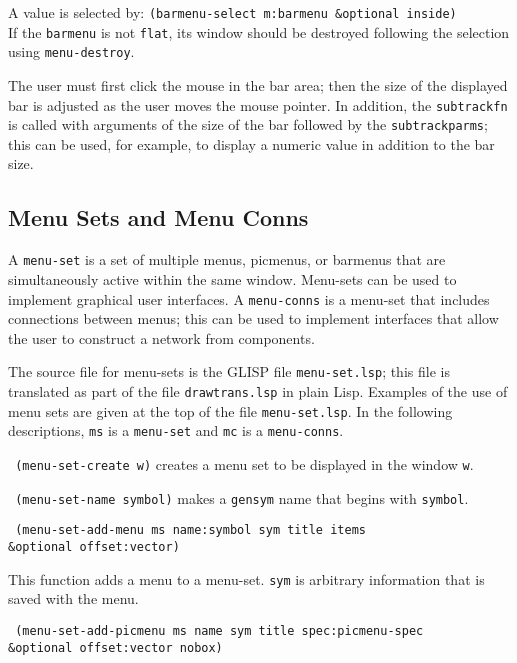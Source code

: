 A value is selected by: {\tt (barmenu-select m:barmenu \&optional inside)} \\
If the {\tt barmenu} is not {\tt flat}, its window should be destroyed
following the selection using {\tt menu-destroy}.

The user must first click the mouse in the bar area; then
the size of the displayed bar is adjusted as the user moves the mouse
pointer.  In addition, the {\tt subtrackfn} is called with arguments
of the size of the bar followed by the {\tt subtrackparms}; this can
be used, for example, to display a numeric value in addition to the
bar size.


\subsection{Menu Sets and Menu Conns}

A {\tt menu-set} is a set of multiple menus, picmenus, or barmenus
that are simultaneously active within the same window.  Menu-sets
can be used to implement graphical user interfaces.  A {\tt menu-conns}
is a menu-set that includes connections between menus; this can be
used to implement interfaces that allow the user to construct a network
from components.

The source file for menu-sets is the GLISP file {\tt menu-set.lsp};
this file is translated as part of the file {\tt drawtrans.lsp} in
plain Lisp.  Examples of the use of menu sets are given at the top
of the file {\tt menu-set.lsp}.  In the following descriptions,
{\tt ms} is a {\tt menu-set} and {\tt mc} is a {\tt menu-conns}.

{\tt \hspace*{0.5in} (menu-set-create w)} creates a menu set to be displayed
in the window {\tt w}.

{\tt \hspace*{0.5in} (menu-set-name symbol)} makes a {\tt gensym} name that
begins with {\tt symbol}.

{\tt \hspace*{0.5in} (menu-set-add-menu ms name:symbol sym title items} \\
\hspace*{1.5in} {\tt \&optional offset:vector)}

This function adds a menu to a menu-set.  {\tt sym} is arbitrary
information that is saved with the menu.

{\tt \hspace*{0.5in} (menu-set-add-picmenu ms name sym title spec:picmenu-spec} \\
\hspace*{1.5in} {\tt \&optional offset:vector nobox)}

